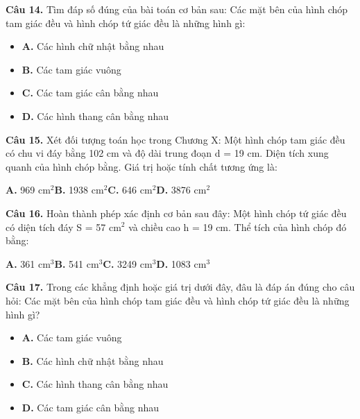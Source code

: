 \documentclass[11pt,a4paper]{article}
\begin{document}
\textbf{\color{primary} Câu 14.} Tìm đáp số đúng của bài toán cơ bản sau: Các mặt bên của hình chóp tam giác đều và hình chóp tứ giác đều là những hình gì:\par
\begin{itemize}\setlength{\itemsep}{1pt}\setlength{\parskip}{0pt}
  \item[] \textbf{A.} Các hình chữ nhật bằng nhau
  \item[] \textbf{B.} Các tam giác vuông
  \item[] \textbf{C.} Các tam giác cân bằng nhau
  \item[] \textbf{D.} Các hình thang cân bằng nhau
\end{itemize}\vspace{2pt}
\textbf{\color{primary} Câu 15.} Xét đối tượng toán học trong Chương X: Một hình chóp tam giác đều có chu vi đáy bằng 102 cm và độ dài trung đoạn d = 19 cm. Diện tích xung quanh của hình chóp bằng. Giá trị hoặc tính chất tương ứng là:\par
\hspace*{1.5em}\textbf{A.} 969 cm$^2$\quad\quad \textbf{B.} 1938 cm$^2$\quad\quad \textbf{C.} 646 cm$^2$\quad\quad \textbf{D.} 3876 cm$^2$\par\vspace{2pt}
\textbf{\color{primary} Câu 16.} Hoàn thành phép xác định cơ bản sau đây: Một hình chóp tứ giác đều có diện tích đáy S = 57 cm$^2$ và chiều cao h = 19 cm. Thể tích của hình chóp đó bằng:\par
\hspace*{1.5em}\textbf{A.} 361 cm$^3$\quad\quad \textbf{B.} 541 cm$^3$\quad\quad \textbf{C.} 3249 cm$^3$\quad\quad \textbf{D.} 1083 cm$^3$\par\vspace{2pt}
\textbf{\color{primary} Câu 17.} Trong các khẳng định hoặc giá trị dưới đây, đâu là đáp án đúng cho câu hỏi: Các mặt bên của hình chóp tam giác đều và hình chóp tứ giác đều là những hình gì?\par
\begin{itemize}\setlength{\itemsep}{1pt}\setlength{\parskip}{0pt}
  \item[] \textbf{A.} Các tam giác vuông
  \item[] \textbf{B.} Các hình chữ nhật bằng nhau
  \item[] \textbf{C.} Các hình thang cân bằng nhau
  \item[] \textbf{D.} Các tam giác cân bằng nhau
\end{itemize}\vspace{2pt}
\end{document}
